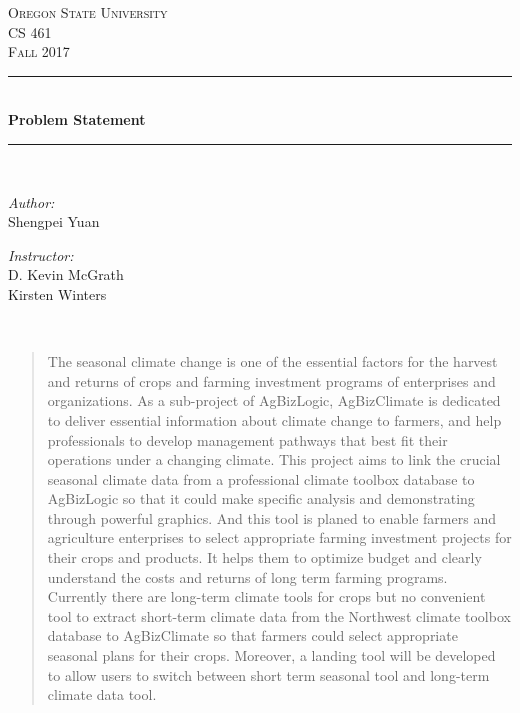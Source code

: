 \documentclass[letterpaper,10pt]{article}
\begin{document}
    \begin{titlepage}
    \newcommand{\HRule}{\rule{\linewidth}{0.5mm}}
    \center
    \textsc{\Large Oregon State University}\\[1.5cm]
    \textsc{\Large CS 461}\\[0.5cm]
    \textsc{\Large Fall 2017}\\[0.5cm]
    \HRule \\[0.4cm]
    { \huge \bfseries Problem Statement}\\[0.4cm] %
    \HRule \\[1.5cm]
    \begin{minipage}{0.4\textwidth}
        \begin{flushleft} \large
        \emph{Author:}\\
        Shengpei Yuan
        \end{flushleft}
    \end{minipage}
    \begin{minipage}{0.4\textwidth}
        \begin{flushright} \large
        \emph{Instructor:} \\
        D. Kevin McGrath\\
        Kirsten Winters
        \end{flushright}
    \end{minipage}\\[2cm]
    \begin{abstract}
    \item The seasonal climate change is one of the essential factors for the harvest and returns of crops and farming investment programs of enterprises and organizations. As a sub-project of AgBizLogic, AgBizClimate is dedicated to deliver essential information about climate change to farmers, and help professionals to develop management pathways that best fit their operations under a changing climate. This project aims to link the crucial seasonal climate data from a professional climate toolbox database to AgBizLogic so that it could make specific analysis and demonstrating through powerful graphics. And this tool is planed to enable farmers and agriculture enterprises to select appropriate farming investment projects for their crops and products. It helps them to optimize budget and clearly understand the costs and returns of long term farming programs.\\
    Currently there are long-term climate tools for crops but no convenient tool to extract short-term climate data from the Northwest climate toolbox database to AgBizClimate so that farmers could select appropriate seasonal plans for their crops. Moreover, a landing tool will be developed to allow users to switch between short term seasonal tool and long-term climate data tool.\\

\end{abstract}
\end{titlepage}
\end{document}

